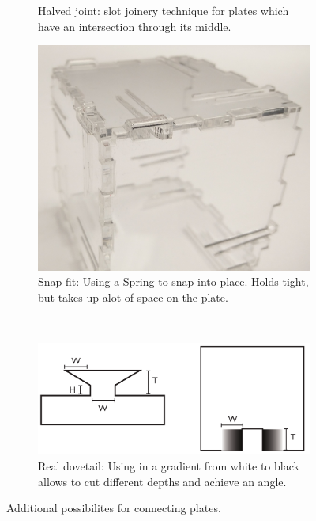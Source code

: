 \documentclass[../ClassicThesis.tex]{subfiles}
\begin{document}
\begin{figure}
\begin{subfigure}[b]{0.45\textwidth}
    \caption{Halved joint: slot joinery technique for plates which have an intersection through its middle.}
    \end{subfigure}
    
    \begin{subfigure}[b]{0.45\textwidth}
    \includegraphics[width=\textwidth]{Images/snapfit.jpg}
    \caption{Snap fit: Using a Spring to snap into place. Holds tight, but takes up alot of space on the plate.}
    \end{subfigure}
    ~
    \begin{subfigure}[b]{0.45\textwidth}
    \includegraphics[width=\textwidth]{Images/06-2-joints-schwalbeMitLaser.png}
    \caption{Real dovetail: Using in a gradient \cite{lasercutLikeABoss} from white to black allows to cut different depths and achieve an angle.}
    \end{subfigure}
    \caption{Additional possibilites for connecting plates.}
    \label{fig:additionalJoints}
\end{figure}
\end{document}

